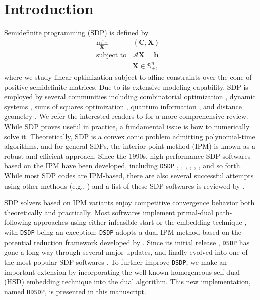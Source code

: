 \section{Introduction}

Semidefinite programming (SDP) is defined
by
\begin{eqnarray}
  \min_{\mathbf{X}} & \left\langle \mathbf{C}, \mathbf{X} \right\rangle & \nonumber \\
  \text{subject to} & \mathcal{A} \mathbf{X} = \mathbf{b} & \\ 
  & \mathbf{X} \in \mathbb{S}_+^n, & \nonumber
\end{eqnarray}
where we study linear optimization subject to affine constraints over the cone of
positive-semidefinite matrices. Due to its extensive modeling capability, SDP is employed by several communities including combinatorial optimization {\cite{goemans1995improved, laurent2005semidefinite}},
dynamic systems {\cite{vandenberghe1996semidefinite}}, sums of squares
optimization {\cite{laurent2009sums}}, quantum
information {\cite{hayashi2016quantum}}, and distance geometry
{\cite{biswas2004semidefinite, so2007theory}}. We refer the interested
readers to {\cite{wolkowicz2005semidefinite}} for a more comprehensive review. \\

While SDP proves useful in practice, a fundamental issue is how to
numerically solve it. Theoretically, SDP is a convex conic problem  admitting polynomial-time algorithms, and for general SDPs, the interior point method (IPM) is known as a robust and efficient approach. Since the 1990s, high-performance SDP softwares based on the IPM have been developed, including {{\texttt{DSDP}}} {\cite{benson2008algorithm}}, 
{\cite{copt}},  {\cite{aps2019mosek}}, 
{\cite{polik2007sedumi}},  {\cite{toh2012implementation}},
 {\cite{borchers2006csdp}},  
{\cite{yamashita2012latest}} and so forth. While most SDP codes are IPM-based, there are also several successful attempts using other methods (e.g., {\cite{kocvara2006pensdp, kwasniewiczimplementation, yang2015sdpnal}})
and a list of these SDP softwares is reviewed by {\citet{majumdar2020recent}}.

SDP solvers based on IPM variants enjoy competitive convergence behavior both theoretically and practically. Most softwares implement primal-dual path-following approaches using either infeasible start
{\cite{potra1998superlinearly}} or the embedding technique
{\cite{potra1998homogeneous}}, with {{\texttt{DSDP}}} being an exception:
{{\texttt{DSDP}}} adopts a dual IPM method based on the potential reduction framework developed by {\citet{benson1999mixed}}.
Since its initial release {\cite{benson2000solving}}, {{\texttt{DSDP}}} has gone a long way through several major updates, and finally evolved into one of the most popular SDP softwares {\cite{benson2008algorithm}}.
To further improve {{\texttt{DSDP}}}, we make an important extension by incorporating the well-known homogeneous self-dual (HSD)
embedding technique into the dual algorithm. This new implementation, named {{\texttt{HDSDP}}}, is presented in this manuscript.

